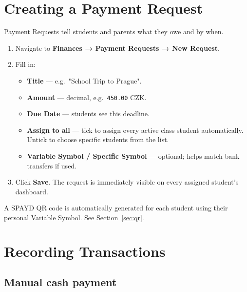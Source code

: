 \documentclass[a4paper,11pt]{article}
\begin{document}
\section{Creating a Payment Request}

Payment Requests tell students and parents what they owe and by when.

\begin{enumerate}[noitemsep]
    \item Navigate to \textbf{Finances → Payment Requests → New Request}.
    \item Fill in:
        \begin{itemize}[noitemsep]
            \item \textbf{Title} — e.g.\ "School Trip to Prague".
            \item \textbf{Amount} — decimal, e.g.\ \texttt{450.00} CZK.
            \item \textbf{Due Date} — students see this deadline.
            \item \textbf{Assign to all} — tick to assign every active class
                  student automatically.
                  Untick to choose specific students from the list.
            \item \textbf{Variable Symbol / Specific Symbol} — optional;
                  helps match bank transfers if used.
        \end{itemize}
    \item Click \textbf{Save}. The request is immediately visible on every
          assigned student's dashboard.
\end{enumerate}

\noindent
A SPAYD QR code is automatically generated for each student using their
personal Variable Symbol. See Section~\ref{sec:qr}.

\section{Recording Transactions}

\subsection{Manual cash payment}
\end{document}
